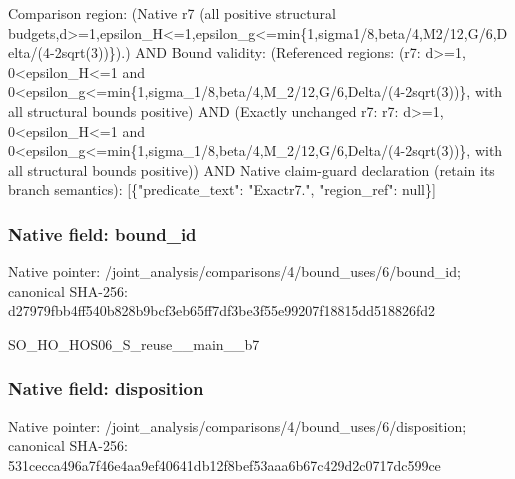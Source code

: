 \documentclass[10pt,a4paper]{article}
\begin{document}
\begingroup\raggedright\sloppy Comparison region:\allowbreak{} (Native r7 (all positive structural budgets,\allowbreak{}d>=\allowbreak{}1,\allowbreak{}epsilon\_\allowbreak{}H<=\allowbreak{}1,\allowbreak{}epsilon\_\allowbreak{}g<=\allowbreak{}min\{1,\allowbreak{}sigma1/\allowbreak{}8,\allowbreak{}beta/\allowbreak{}4,\allowbreak{}M2/\allowbreak{}12,\allowbreak{}G/\allowbreak{}6,\allowbreak{}Delta/\allowbreak{}(4-2sqrt(3))\}).) AND Bound validity:\allowbreak{} (Referenced regions:\allowbreak{} (r7:\allowbreak{} d>=\allowbreak{}1,\allowbreak{} 0<epsilon\_\allowbreak{}H<=\allowbreak{}1 and 0<epsilon\_\allowbreak{}g<=\allowbreak{}min\{1,\allowbreak{}sigma\_\allowbreak{}1/\allowbreak{}8,\allowbreak{}beta/\allowbreak{}4,\allowbreak{}M\_\allowbreak{}2/\allowbreak{}12,\allowbreak{}G/\allowbreak{}6,\allowbreak{}Delta/\allowbreak{}(4-2sqrt(3))\},\allowbreak{} with all structural bounds positive) AND (Exactly unchanged r7:\allowbreak{} r7:\allowbreak{} d>=\allowbreak{}1,\allowbreak{} 0<epsilon\_\allowbreak{}H<=\allowbreak{}1 and 0<epsilon\_\allowbreak{}g<=\allowbreak{}min\{1,\allowbreak{}sigma\_\allowbreak{}1/\allowbreak{}8,\allowbreak{}beta/\allowbreak{}4,\allowbreak{}M\_\allowbreak{}2/\allowbreak{}12,\allowbreak{}G/\allowbreak{}6,\allowbreak{}Delta/\allowbreak{}(4-2sqrt(3))\},\allowbreak{} with all structural bounds positive)) AND Native claim-guard declaration (retain its branch semantics):\allowbreak{} [\{"predicate\_\allowbreak{}text":\allowbreak{} "Exactr7.",\allowbreak{} "region\_\allowbreak{}ref":\allowbreak{} null\}]\par\endgroup

\subsubsection{Native field: bound\_\allowbreak{}id}
Native pointer: /joint\_\allowbreak{}analysis/comparisons/4/bound\_\allowbreak{}uses/6/bound\_\allowbreak{}id; canonical SHA-256: d27979fbb4ff540b828b9bcf3eb65ff7df3be3f55e99207f18815dd518826fd2

\begingroup\raggedright\sloppy SO\_\allowbreak{}HO\_\allowbreak{}HOS06\_\allowbreak{}S\_\allowbreak{}reuse\_\allowbreak{}\_\allowbreak{}main\_\allowbreak{}\_\allowbreak{}b7\par\endgroup

\subsubsection{Native field: disposition}
Native pointer: /joint\_\allowbreak{}analysis/comparisons/4/bound\_\allowbreak{}uses/6/disposition; canonical SHA-256: 531cecca496a7f46e4aa9ef40641db12f8bef53aaa6b67c429d2c0717dc599ce
\end{document}
